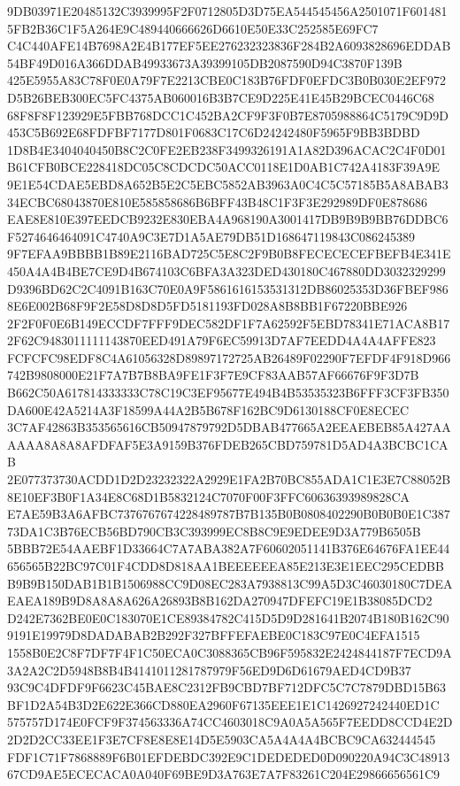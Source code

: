 \documentclass[UTF8,fontset=fandol,zihao=-4,a4paper]{ctexart}
\begin{document}
{{9DB03971E20485132C3939995F2F0712805D3D75EA544545456A2501071F6014815FB2B36C1F5A264E9C489440666626D6610E50E33C252585E69FC7
C4C440AFE14B7698A2E4B177EF5EE276232323836F284B2A6093828696EDDAB54BF49D016A366DDAB49933673A39399105DB2087590D94C3870F139B
425E5955A83C78F0E0A79F7E2213CBE0C183B76FDF0EFDC3B0B030E2EF972D5B26BEB300EC5FC4375AB060016B3B7CE9D225E41E45B29BCEC0446C68
68F8F8F123929E5FBB768DCC1C452BA2CF9F3F0B7E8705988864C5179C9D9D453C5B692E68FDFBF7177D801F0683C17C6D24242480F5965F9BB3BDBD
1D8B4E3404040450B8C2C0FE2EB238F3499326191A1A82D396ACAC2C4F0D01B61CFB0BCE228418DC05C8CDCDC50ACC0118E1D0AB1C742A4183F39A9E
9E1E54CDAE5EBD8A652B5E2C5EBC5852AB3963A0C4C5C57185B5A8ABAB334ECBC68043870E810E585858686B6BFF43B48C1F3F3E292989DF0E878686
EAE8E810E397EEDCB9232E830EBA4A968190A3001417DB9B9B9BB76DDBC6F5274646464091C4740A9C3E7D1A5AE79DB51D168647119843C086245389
9F7EFAA9BBBB1B89E2116BAD725C5E8C2F9B0B8FECECECEFBEFB4E341E450A4A4B4BE7CE9D4B674103C6BFA3A323DED430180C467880DD3032329299
D9396BD62C2C4091B163C70E0A9F5861616153531312DB86025353D36FBEF9868E6E002B68F9F2E58D8D8D5FD5181193FD028A8B8BB1F67220BBE926
2F2F0F0E6B149ECCDF7FFF9DEC582DF1F7A62592F5EBD78341E71ACA8B172F62C9483011111143870EED491A79F6EC59913D7AF7EEDD4A4A4AFFE823
FCFCFC98EDF8C4A61056328D89897172725AB26489F02290F7EFDF4F918D966742B9808000E21F7A7B7B8BA9FE1F3F7E9CF83AAB57AF66676F9F3D7B
B662C50A617814333333C78C19C3EF95677E494B4B53535323B6FFF3CF3FB350DA600E42A5214A3F18599A44A2B5B678F162BC9D6130188CF0E8ECEC
3C7AF42863B353565616CB50947879792D5DBAB477665A2EEAEBEB85A427AAAAAA8A8A8AFDFAF5E3A9159B376FDEB265CBD759781D5AD4A3BCBC1CAB
2E077373730ACDD1D2D23232322A2929E1FA2B70BC855ADA1C1E3E7C88052B8E10EF3B0F1A34E8C68D1B5832124C7070F00F3FFC60636393989828CA
E7AE59B3A6AFBC7376767674228489787B7B135B0B0808402290B0B0B0E1C38773DA1C3B76ECB56BD790CB3C393999EC8B8C9E9EDEE9D3A779B6505B
5BBB72E54AAEBF1D33664C7A7ABA382A7F60602051141B376E64676FA1EE44656565B22BC97C01F4CDD8D818AA1BEEEEEEA85E213E3E1EEC295CEDBB
B9B9B150DAB1B1B1506988CC9D08EC283A7938813C99A5D3C46030180C7DEAEAEA189B9D8A8A8A626A26893B8B162DA270947DFEFC19E1B38085DCD2
D242E7362BE0E0C183070E1CE89384782C415D5D9D281641B2074B180B162C909191E19979D8DADABAB2B292F327BFFEFAEBE0C183C97E0C4EFA1515
1558B0E2C8F7DF7F4F1C50ECA0C3088365CB96F595832E2424844187F7ECD9A3A2A2C2D5948B8B4B4141011281787979F56ED9D6D61679AED4CD9B37
93C9C4DFDF9F6623C45BAE8C2312FB9CBD7BF712DFC5C7C7879DBD15B63BF1D2A54B3D2E622E366CD880EA2960F67135EEE1E1C1426927242440ED1C
575757D174E0FCF9F374563336A74CC4603018C9A0A5A565F7EEDD8CCD4E2D2D2D2CC33EE1F3E7CF8E8E8E14D5E5903CA5A4A4A4BCBC9CA632444545
FDF1C71F7868889F6B01EFDEBDC392E9C1DEDEDED0D090220A94C3C4891367CD9AE5ECECACA0A040F69BE9D3A763E7A7F83261C204E29866656561C9
}}
\end{document}
